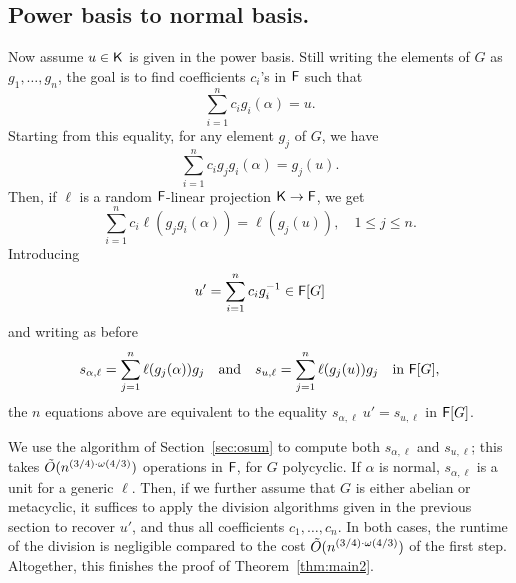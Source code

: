 
\subsection{Power basis to normal basis.}

Now assume $u \in {\mathsf{K}}$ is given in the power basis. Still writing the
elements of $G$ as $g_1,\dots,g_n$, the goal is to find coefficients
$c_i$'s in ${\mathsf{F}}$ such that
$$ \sum_{i = 1}^{n} c_i g_i(\alpha) = u.$$ Starting from this
equality, for any element $g_j$ of $G$, we have
$$ \sum_{i = 1}^{n} c_i g_jg_i(\alpha) = g_j(u).$$
Then, if $\ell$ is a random ${\mathsf{F}}$-linear projection ${\mathsf{K}}\to{\mathsf{F}}$, we get 
$$\sum_{i = 1}^{n} c_i \ell(g_jg_i(\alpha)) = \ell(g_j(u)), \quad  1 \le j \le n.$$
Introducing 
$$u'= \sum_{i=1}^{n} c_i g_i^{-1} \in {\mathsf{F}}[G]$$
and writing as before
$$s_{\alpha,\ell}=\sum_{j=1}^{n} \ell(g_j(\alpha))g_j
\quad\text{and}\quad
s_{u,\ell} = \sum_{j=1}^{n}\ell(g_j(u)) g_j \quad\text{in~} {\mathsf{F}}[G],$$ the
$n$ equations above are equivalent to the equality
$s_{\alpha,\ell}\ u' = s_{u,\ell}$ in ${\mathsf{F}}[G]$.

We use the algorithm of Section~\ref{sec:osum} to compute both
$s_{\alpha,\ell}$ and $s_{u,\ell}$; this takes $\tilde{O}(n^{(3/4)\cdot \omega(4/3)})$
operations in ${\mathsf{F}}$, for $G$ polycyclic. If $\alpha$ is normal,
$s_{\alpha,\ell}$ is a unit for a generic $\ell$. Then, if we further
assume that $G$ is either abelian or metacyclic, it suffices to apply
the division algorithms given in the previous section to recover $u'$,
and thus all coefficients $c_1,\dots,c_n$. In both cases, the runtime
of the division is negligible compared to the cost $\tilde{O}(n^{(3/4)\cdot \omega(4/3)})$ of
the first step. Altogether, this finishes the proof of
Theorem~\ref{thm:main2}.


